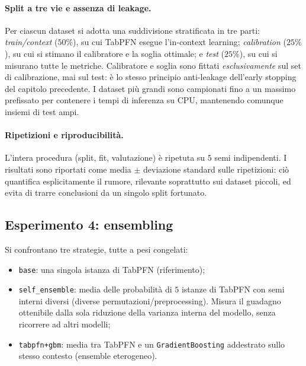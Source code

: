 \paragraph{Split a tre vie e assenza di leakage.} Per ciascun dataset si adotta
una suddivisione stratificata in tre parti: \emph{train/context}
($50\%$), su cui TabPFN esegue l'in-context learning; \emph{calibration}
($25\%$), su cui si stimano il calibratore e la soglia ottimale; e \emph{test}
($25\%$), su cui si misurano tutte le metriche. Calibratore e soglia sono
fittati \emph{esclusivamente} sul set di calibrazione, mai sul test: è lo stesso
principio anti-leakage dell'early stopping del capitolo precedente. I dataset
più grandi sono campionati fino a un massimo prefissato per contenere i tempi di
inferenza su CPU, mantenendo comunque insiemi di test ampi.

\paragraph{Ripetizioni e riproducibilità.} L'intera procedura (split, fit,
valutazione) è ripetuta su $5$ semi indipendenti. I risultati sono riportati come
media $\pm$ deviazione standard sulle ripetizioni: ciò quantifica esplicitamente
il rumore, rilevante soprattutto sui dataset piccoli, ed evita di trarre
conclusioni da un singolo split fortunato.

\subsection{Esperimento 4: ensembling}
\label{sec:exp-ensemble}
Si confrontano tre strategie, tutte a pesi congelati:
\begin{itemize}[nosep]
  \item \texttt{base}: una singola istanza di TabPFN (riferimento);
  \item \texttt{self\_ensemble}: media delle probabilità di $5$ istanze di
  TabPFN con semi interni diversi (diverse permutazioni/preprocessing). Misura il
  guadagno ottenibile dalla sola riduzione della varianza interna del modello,
  senza ricorrere ad altri modelli;
  \item \texttt{tabpfn+gbm}: media tra TabPFN e un \texttt{GradientBoosting}
  addestrato sullo stesso contesto (ensemble eterogeneo).
\end{itemize}

